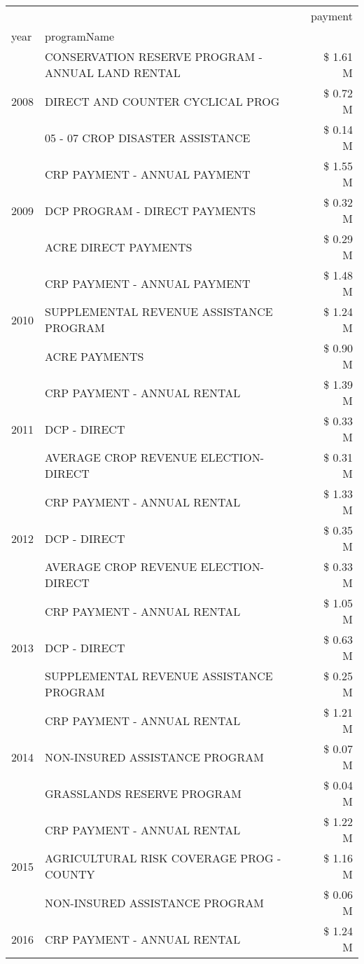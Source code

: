 \begin{tabular}{llr}
\toprule
 &  & payment \\
year & programName &  \\
\midrule
\multirow[t]{3}{*}{2008} & CONSERVATION RESERVE PROGRAM - ANNUAL LAND RENTAL & \$ 1.61 M \\
 & DIRECT AND COUNTER CYCLICAL PROG & \$ 0.72 M \\
 & 05 - 07 CROP DISASTER ASSISTANCE & \$ 0.14 M \\
\cline{1-3}
\multirow[t]{3}{*}{2009} & CRP PAYMENT - ANNUAL PAYMENT & \$ 1.55 M \\
 & DCP PROGRAM - DIRECT PAYMENTS & \$ 0.32 M \\
 & ACRE DIRECT PAYMENTS & \$ 0.29 M \\
\cline{1-3}
\multirow[t]{3}{*}{2010} & CRP PAYMENT - ANNUAL PAYMENT & \$ 1.48 M \\
 & SUPPLEMENTAL REVENUE ASSISTANCE PROGRAM & \$ 1.24 M \\
 & ACRE PAYMENTS & \$ 0.90 M \\
\cline{1-3}
\multirow[t]{3}{*}{2011} & CRP PAYMENT - ANNUAL RENTAL & \$ 1.39 M \\
 & DCP - DIRECT & \$ 0.33 M \\
 & AVERAGE CROP REVENUE ELECTION-DIRECT & \$ 0.31 M \\
\cline{1-3}
\multirow[t]{3}{*}{2012} & CRP PAYMENT - ANNUAL RENTAL & \$ 1.33 M \\
 & DCP - DIRECT & \$ 0.35 M \\
 & AVERAGE CROP REVENUE ELECTION-DIRECT & \$ 0.33 M \\
\cline{1-3}
\multirow[t]{3}{*}{2013} & CRP PAYMENT - ANNUAL RENTAL & \$ 1.05 M \\
 & DCP - DIRECT & \$ 0.63 M \\
 & SUPPLEMENTAL REVENUE ASSISTANCE PROGRAM & \$ 0.25 M \\
\cline{1-3}
\multirow[t]{3}{*}{2014} & CRP PAYMENT - ANNUAL RENTAL & \$ 1.21 M \\
 & NON-INSURED ASSISTANCE PROGRAM & \$ 0.07 M \\
 & GRASSLANDS RESERVE PROGRAM & \$ 0.04 M \\
\cline{1-3}
\multirow[t]{3}{*}{2015} & CRP PAYMENT - ANNUAL RENTAL & \$ 1.22 M \\
 & AGRICULTURAL RISK COVERAGE PROG - COUNTY & \$ 1.16 M \\
 & NON-INSURED ASSISTANCE PROGRAM & \$ 0.06 M \\
\cline{1-3}
\multirow[t]{3}{*}{2016} & CRP PAYMENT - ANNUAL RENTAL & \$ 1.24 M \\

\end{tabular}
